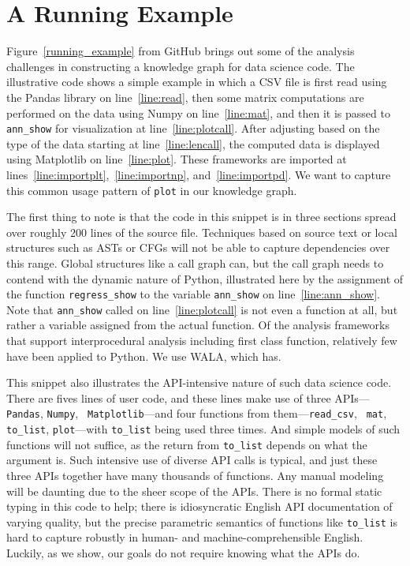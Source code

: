 \section{A Running Example}
\label{sec:example}

Figure~\ref{running_example} from GitHub brings out some of the analysis  
challenges in constructing a knowledge graph for data science code.  
The illustrative code shows a simple example in which a CSV file is  
first read using the Pandas library on line~\ref{line:read}, then some  
matrix computations are performed on the data using Numpy on  
line~\ref{line:mat}, and then it is passed to {\tt ann\_show} for  
visualization at line~\ref{line:plotcall}.  After adjusting based on  
the type of the data starting at line~\ref{line:lencall}, the computed data is  
displayed using Matplotlib on line~\ref{line:plot}.  These frameworks  
are imported at lines~\ref{line:importplt},~\ref{line:importnp}, and~\ref{line:importpd}.  We want to  
capture this common usage pattern of {\tt plot} in our knowledge  
graph. 

 The first thing to note is that the code in this snippet is in three
sections spread over roughly 200 lines of the source file.  Techniques
based on source text or local structures such as ASTs or CFGs will not
be able to capture dependencies over this range.  Global structures like a
call graph can, but the call graph needs to contend with the dynamic
nature of Python, illustrated here by the assignment of the function
{\tt regress\_show} to the variable {\tt ann\_show} on
line~\ref{line:ann_show}.  Note that {\tt ann\_show} called on
line~\ref{line:plotcall} is not even a function at all, but rather a variable
assigned from the actual function.  Of the analysis frameworks that
support interprocedural analysis including first class function,
relatively few have been applied to Python.  We use WALA, which has.

This snippet also illustrates the API-intensive nature of such data
science code.  There are fives lines of user code, and these lines
make use of three APIs---{\tt Pandas}, {\tt Numpy}, {\tt
  Matplotlib}---and four functions from them---{\tt read\_csv}, {\tt
  mat}, {\tt to\_list}, {\tt plot}---with {\tt to\_list} being used
three times.  And simple models of such functions will not suffice, as
the return from {\tt to\_list} depends on what the argument is.  Such
intensive use of diverse API calls is typical, and just these three
APIs together have many thousands of functions.  Any manual modeling
will be daunting due to the sheer scope of the APIs.  There is no
formal static typing in this code to help; there is idiosyncratic
English API documentation of varying quality, but the precise
parametric semantics of functions like {\tt to\_list} is hard to
capture robustly in human- and machine-comprehensible English.
Luckily, as we show, our goals do not require knowing what the APIs
do.

